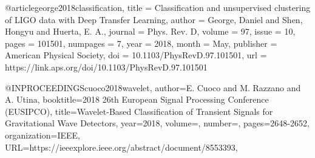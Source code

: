 {{{{{{@article{george2018classification,
  title = {Classification and unsupervised clustering of LIGO data with Deep Transfer Learning},
  author = {George, Daniel and Shen, Hongyu and Huerta, E. A.},
  journal = {Phys. Rev. D},
  volume = {97},
  issue = {10},
  pages = {101501},
  numpages = {7},
  year = {2018},
  month = {May},
  publisher = {American Physical Society},
  doi = {10.1103/PhysRevD.97.101501},
  url = {https://link.aps.org/doi/10.1103/PhysRevD.97.101501}
}


@INPROCEEDINGS{cuoco2018wavelet,  
  author={E. {Cuoco} and M. {Razzano} and A. {Utina}},  
  booktitle={2018 26th European Signal Processing Conference (EUSIPCO)},   
  title={Wavelet-Based Classification of Transient Signals for Gravitational Wave Detectors},   
  year={2018},  
  volume={},  
  number={},  
  pages={2648-2652},
  organization={IEEE},
  URL={https://ieeexplore.ieee.org/abstract/document/8553393},
}

}}}}}}
